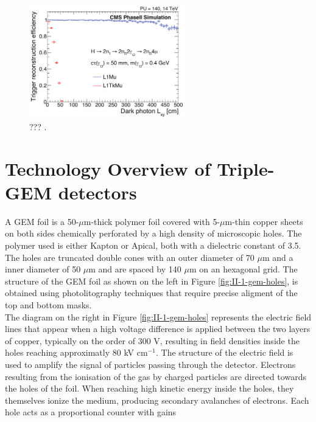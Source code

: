     \begin{figure}[h!]
      \centering
      \includegraphics[width=0.6\textwidth]{img/II-1-gem/dark-photon.pdf}
      \caption{??? \cite{Colaleo:2021453}.}
      \label{fig:II-1-gem-dark-photon}
    \end{figure}

  \section{Technology Overview of Triple-GEM detectors}

    A GEM foil is a 50-$\mu$m-thick polymer foil covered with 5-$\mu$m-thin copper sheets on both sides chemically perforated by a high density of microscopic holes. The polymer used is either Kapton or Apical, both with a dielectric constant of 3.5. The holes are truncated double cones with an outer diameter of 70 $\mu$m and a inner diameter of 50 $\mu$m and are spaced by 140 $\mu$m on an hexagonal grid. The structure of the GEM foil as shown on the left in Figure \ref{fig:II-1-gem-holes}, is obtained using photolitography techniques that require precise aligment of the top and bottom masks. \\

    The diagram on the right in Figure \ref{fig:II-1-gem-holes} represents the electric field lines that appear when a high voltage difference is applied between the two layers of copper, typically on the order of 300 V, resulting in field densities inside the holes reaching approximatly 80 kV cm$^{-1}$. The structure of the electric field is used to amplify the signal of particles passing through the detector. Electrons resulting from the ionisation of the gas by charged particles are directed towards the holes of the foil. When reaching high kinetic energy inside the holes, they themselves ionize the medium, producing secondary avalanches of electrons. Each hole acts as a proportional counter with gains  \\

